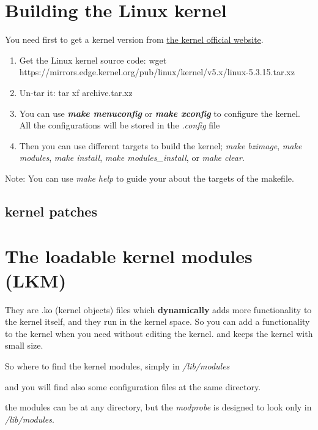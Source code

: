 \documentclass{article}
\begin{document}
\section{Building the Linux kernel}
You need first to get a kernel version from \href{https://kernel.org/pub/linux/kernel/}{the kernel official website}.

\begin{enumerate}
    \item Get the Linux kernel source code:
        wget https://mirrors.edge.kernel.org/pub/linux/kernel/v5.x/linux-5.3.15.tar.xz
    \item Un-tar it: 
        tar xf archive.tar.xz
    \item You can use \textit{\textbf{make menuconfig}} or \textit{\textbf{make xconfig}} to configure the kernel.
    All the configurations will be stored in the \textit{.config} file
    \item Then you can use different targets to build the kernel; \textit{make bzimage}, \textit{make modules}, \textit{make install}, \textit{make modules\_install}, or \textit{make clear}.
\end{enumerate}

Note: You can use \textit{make help} to guide your about the targets of the makefile.

\subsection{kernel patches}

\section{The loadable kernel modules (LKM)}
They are .ko (kernel objects) files which \textbf{dynamically} adds more functionality to the kernel itself, and they run in the kernel space. 
So you can add a functionality to the kernel when you need without editing the kernel. and keeps the kernel with small size.

So where to find the kernel modules, simply in \textit{/lib/modules}



and you will find also some configuration files at the same directory.

the modules can be at any directory, but the \textit{modprobe} is designed to look only in \textit{/lib/modules}.
\end{document}
